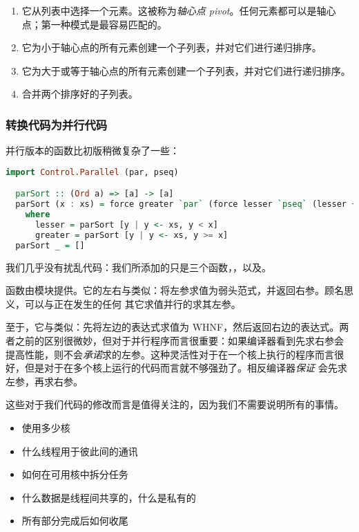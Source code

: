 \documentclass[./main.tex]{subfiles}
\begin{document}
\begin{enumerate}
  \item 它从列表中选择一个元素。这被称为\textit{轴心点 pivot}。任何元素都可以是轴心点；第一种模式是最容易匹配的。
  \item 它为小于轴心点的所有元素创建一个子列表，并对它们进行递归排序。
  \item 它为大于或等于轴心点的所有元素创建一个子列表，并对它们进行递归排序。
  \item 合并两个排序好的子列表。
\end{enumerate}

\subsubsection*{转换代码为并行代码}

并行版本的函数比初版稍微复杂了一些：

\begin{lstlisting}[language=Haskell]
  import Control.Parallel (par, pseq)

  parSort :: (Ord a) => [a] -> [a]
  parSort (x : xs) = force greater `par` (force lesser `pseq` (lesser ++ x : greater))
    where
      lesser = parSort [y | y <- xs, y < x]
      greater = parSort [y | y <- xs, y >= x]
  parSort _ = []
\end{lstlisting}

我们几乎没有扰乱代码：我们所添加的只是三个函数，，以及。

函数由模块提供。它的左右与类似：将左参求值为弱头范式，并返回右参。顾名思义，可以与正在发生的任何
其它求值并行的求其左参。

至于，它与类似：先将左边的表达式求值为 WHNF，然后返回右边的表达式。两者之前的区别很微妙，但对于并行程序而言很重要：如果编译器看到先求右参会
提高性能，则不会\textit{承诺}求的左参。这种灵活性对于在一个核上执行的程序而言很好，但是对于在多个核上运行的代码而言就不够强劲了。相反编译器\textit{保证}
会先求左参，再求右参。

这些对于我们代码的修改而言是值得关注的，因为我们不需要说明所有的事情。

\begin{itemize}
  \item 使用多少核
  \item 什么线程用于彼此间的通讯
  \item 如何在可用核中拆分任务
  \item 什么数据是线程间共享的，什么是私有的
  \item 所有部分完成后如何收尾
\end{itemize}
\end{document}
